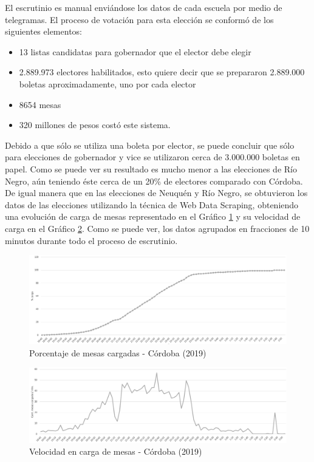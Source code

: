 El escrutinio es manual enviándose los datos de cada escuela por medio de telegramas. El proceso de votación para esta elección se conformó de los siguientes elementos: 
\begin{itemize}
    \item 13 listas candidatas para gobernador que el elector debe elegir
    \item 2.889.973 electores habilitados, esto quiere decir que se prepararon 2.889.000 boletas aproximadamente, uno por cada elector
    \item 8654 mesas
    \item 320 millones de pesos costó este sistema. 
\end{itemize}
Debido a que sólo se utiliza una boleta por elector, se puede concluir que sólo para elecciones de gobernador y vice se utilizaron cerca de 3.000.000 boletas en papel. Como se puede ver su resultado es mucho menor a las elecciones de Río Negro, aún teniendo éste cerca de un 20\% de electores comparado con Córdoba. De igual manera que en las elecciones de Neuquén y Río Negro, se obtuvieron los datos de las elecciones utilizando la técnica de Web Data Scraping, obteniendo una evolución de carga de mesas representado en el Gráfico \ref{graf:porcentajeCordoba} y su velocidad de carga en el Gráfico \ref{graf:velocidadCordoba}. Como se puede ver, los datos agrupados en fracciones de 10 minutos durante todo el proceso de escrutinio.

\begin{figure}[h!]
  \includegraphics[width=1\textwidth]{img/E4YqKc5Tcu.png}
  \caption{Porcentaje de mesas cargadas - Córdoba (2019)}
  \label{graf:porcentajeCordoba}
\end{figure}

\begin{figure}[h!]
  \includegraphics[width=1\textwidth]{img/9rEiyqeSFw.png}
  \caption{Velocidad en carga de mesas - Córdoba (2019)}
  \label{graf:velocidadCordoba}
\end{figure}

